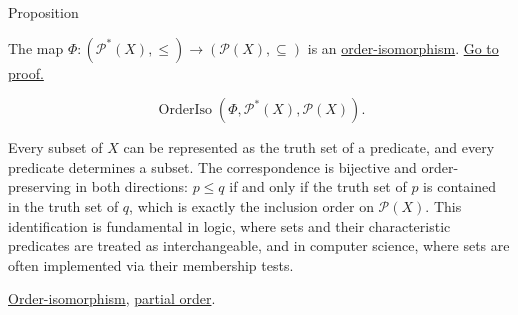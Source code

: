 \begin{propositionbox}{Proposition}
\begin{proposition}
\label{prop:predicates-power-sets-iso}
The map $\Phi : (\mathcal{P}^*(X), \leq) \to (\mathcal{P}(X), \subseteq)$
is an \hyperref[def:order-isomorphism]{order-isomorphism}.
\hyperref[prf:predicates-power-sets-iso]{Go to proof.}
\end{proposition}
\end{propositionbox}

\begin{remark*}
\[
\operatorname{OrderIso}(\Phi, \mathcal{P}^*(X), \mathcal{P}(X)).
\]
\end{remark*}

\begin{remark*}[Interpretation]
Every subset of $X$ can be represented as the truth set of a predicate,
and every predicate determines a subset.  The correspondence is bijective
and order-preserving in both directions: $p \leq q$ if and only if the
truth set of $p$ is contained in the truth set of $q$, which is exactly
the inclusion order on $\mathcal{P}(X)$.  This identification is
fundamental in logic, where sets and their characteristic predicates are
treated as interchangeable, and in computer science, where sets are
often implemented via their membership tests.
\end{remark*}

\begin{dependencies}
\hyperref[def:order-isomorphism]{Order-isomorphism},
\hyperref[def:lattice-order-partial-order]{partial order}.
\end{dependencies}
